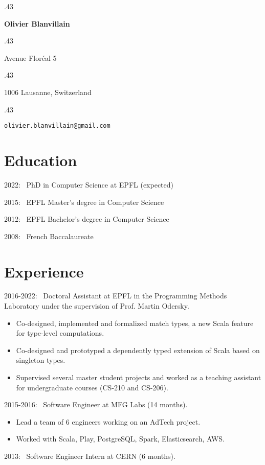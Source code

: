 \documentclass[marginmode, 11pt]{res}
\newcommand{\centered}[1]{\moveleft.43\hoffset\centerline{#1}}
\renewcommand{\:}[0]{:~}
\begin{document}
\centered{\LARGE\textbf{Olivier Blanvillain}}
\vspace{10pt}

\centered{Avenue Floréal 5}
\centered{1006 Lausanne, Switzerland}
\vspace{3pt}
\vspace{2pt}
\centered{\texttt{olivier.blanvillain@gmail.com}}

\begin{resume}

\section{Education}

2022\: PhD in Computer Science at EPFL (expected)

2015\: EPFL Master's degree in Computer Science

2012\: EPFL Bachelor's degree in Computer Science

2008\: French Baccalaureate

\section{Experience}

2016-2022\: Doctoral Assistant at EPFL in the Programming Methods Laboratory under the supervision of Prof. Martin Odersky.

\begin{itemize}
  \item Co-designed, implemented and formalized match types, a new Scala feature for type-level computations.
  \item Co-designed and prototyped a dependently typed extension of Scala based on singleton types.
  \item Supervised several master student projects and worked as a teaching assistant for undergraduate courses (CS-210 and CS-206).
\end{itemize}

2015-2016\: Software Engineer at MFG Labs (14 months).

\begin{itemize}
  \item Lead a team of 6 engineers working on an AdTech project.
  \item Worked with Scala, Play, PostgreSQL, Spark, Elasticsearch, AWS.
\end{itemize}

2013\: Software Engineer Intern at CERN (6 months).


\end{resume}
\end{document}

